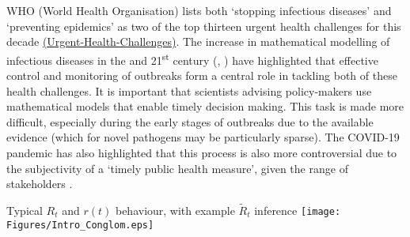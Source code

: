 \documentclass[10pt,journal,compsoc]{IEEEtran}
\newcommand{\ts}{\textsuperscript}
\begin{document}
 WHO (World Health Organisation) lists both `stopping infectious diseases' and `preventing epidemics' as two of the top thirteen urgent health challenges for this decade \href{https://www.who.int/news-room/photo-story/photo-story-detail/urgent-health-challenges-for-the-next-decade}{(Urgent-Health-Challenges)}. The increase in mathematical modelling of infectious diseases in the  and 21\ts{st} century (\cite{Ross}, \cite{Kermack-McKendrick}) have highlighted that effective control and monitoring of outbreaks form a central role in tackling both of these health challenges. It is important that scientists advising policy-makers use mathematical models that enable timely decision making. This task is made more difficult, especially during the early stages of outbreaks due to the available evidence (which for novel pathogens may be particularly sparse). The COVID-19 pandemic has also highlighted that this process is also more controversial due to the subjectivity of a `timely public health measure', given the range of stakeholders \cite{Lin-Meissner}.\\

\begin{figure*}
\centering
Typical $R_t$ and $r(t)$ behaviour, with example $\tilde{R}_t$ inference
\texttt{[image: Figures/Intro\_Conglom.eps]}
\label{fig:Intro_Conglom}
\end{figure*} 
\end{document}
